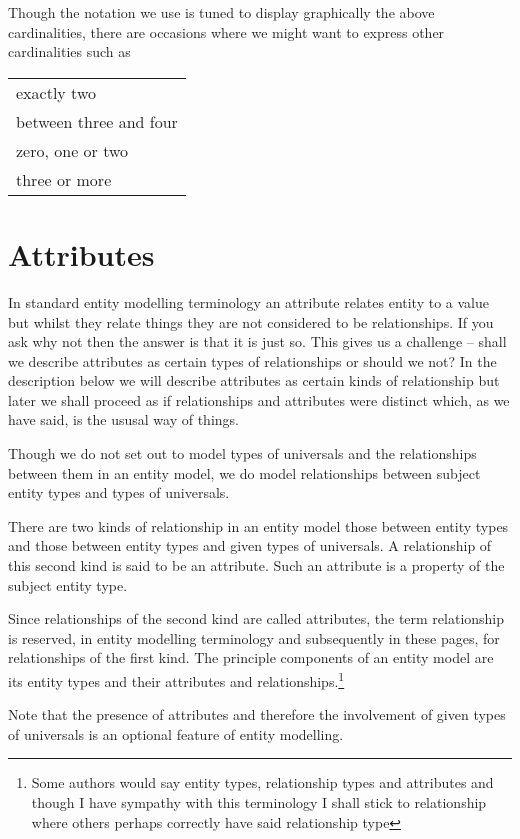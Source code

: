 Though the notation we use is tuned to display graphically the above cardinalities, there are occasions where we might want to express other cardinalities such as
\begin{center}
\begin{tabular} {l}
exactly two \\
between three and four \\
zero, one or two\\
three or more \\
\end{tabular}
\end{center}

\section{Attributes}
\mynote
In standard entity modelling terminology an attribute relates entity to a value but whilst they relate things they are not considered to be relationships. If you ask why not then the answer is that it is just so.
This gives us a challenge -- shall we describe attributes as certain types of relationships or should we not?
In the description below we will describe attributes as certain kinds of relationship but later we shall 
proceed as if relationships and attributes were distinct which, as we have said, is the ususal way of things. 

\mynote Though we do not set out to model types of universals and the relationships between them 
in an entity model, we do model relationships between subject entity types and types of universals. 

\mynote 
There are two kinds of relationship 
in an entity model those between entity types and those between 
entity types and  given types of universals. 
A relationship of this second kind is said to be an attribute. Such an attribute is a property of the subject entity type. 

\mynote Since relationships of the second kind are called attributes, the term relationship is reserved, in entity modelling terminology and subsequently in these pages, for relationships of the first kind.  The principle components of an entity model are its entity types and their attributes and relationships.\footnote{Some authors would say entity types, relationship types and attributes and though I have sympathy with this terminology I shall stick to relationship where others perhaps correctly have said relationship type}

\mynote
Note that the presence of attributes and therefore the involvement of given types of universals
is an optional feature of entity modelling. 

